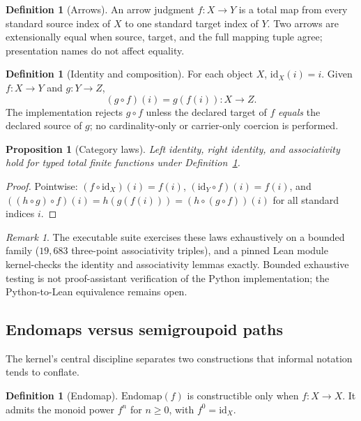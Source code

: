 \documentclass[11pt]{amsart}
\newtheorem{proposition}[theorem]{Proposition}
\theoremstyle{definition}
\newtheorem{definition}[theorem]{Definition}
\theoremstyle{remark}
\newtheorem{remark}[theorem]{Remark}
\newcommand{\id}{\mathrm{id}}
\begin{document}
\begin{definition}[Arrows]\label{def:arrow}
An arrow judgment $f : X \to Y$ is a total map from every standard source index of $X$ to one standard target index of $Y$. Two arrows are extensionally equal when source, target, and the full mapping tuple agree; presentation names do not affect equality.
\end{definition}

\begin{definition}[Identity and composition]\label{def:comp}
For each object $X$, $\id_X(i)=i$. Given $f : X \to Y$ and $g : Y \to Z$,
\[
(g \circ f)(i) = g(f(i)) : X \to Z .
\]
The implementation rejects $g \circ f$ unless the declared target of $f$ \emph{equals} the declared source of $g$; no cardinality-only or carrier-only coercion is performed.
\end{definition}

\begin{proposition}[Category laws]\label{prop:laws}
Left identity, right identity, and associativity hold for typed total finite functions under Definition~\textup{\ref{def:comp}}.
\end{proposition}

\begin{proof}
Pointwise: $(f \circ \id_X)(i) = f(i)$, $(\id_Y \circ f)(i) = f(i)$, and $((h \circ g) \circ f)(i) = h(g(f(i))) = (h \circ (g \circ f))(i)$ for all standard indices $i$.
\end{proof}

\begin{remark}
The executable suite exercises these laws exhaustively on a bounded family ($19{,}683$ three-point associativity triples), and a pinned Lean module kernel-checks the identity and associativity lemmas exactly. Bounded exhaustive testing is not proof-assistant verification of the Python implementation; the Python-to-Lean equivalence remains open.
\end{remark}

\subsection{Endomaps versus semigroupoid paths}

The kernel's central discipline separates two constructions that informal notation tends to conflate.

\begin{definition}[Endomap]
$\mathrm{Endomap}(f)$ is constructible only when $f : X \to X$. It admits the monoid power $f^n$ for $n \ge 0$, with $f^0 = \id_X$.
\end{definition}
\end{document}
